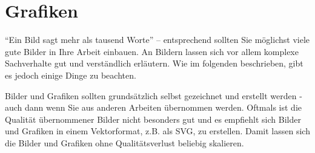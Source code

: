 \section{Grafiken}\label{sec:graphics}
%
\enquote{Ein Bild sagt mehr als tausend Worte} -- entsprechend sollten Sie möglichst viele gute Bilder in Ihre Arbeit einbauen. An Bildern lassen sich vor allem komplexe Sachverhalte gut und verständlich erläutern. Wie im folgenden beschrieben, gibt es jedoch einige Dinge zu beachten.

Bilder und Grafiken sollten grundsätzlich selbst gezeichnet und erstellt werden - auch dann wenn Sie aus anderen Arbeiten übernommen werden. Oftmals ist die Qualität übernommener Bilder nicht besonders gut und es empfiehlt sich Bilder und Grafiken in einem Vektorformat, z.B. als SVG, zu erstellen. Damit lassen sich die Bilder und Grafiken ohne Qualitätsverlust beliebig skalieren.
